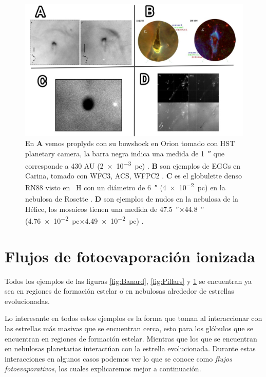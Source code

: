 \documentclass{book}
\begin{document}
\begin{figure}[htb]
    \centering
    \includegraphics[width=1 \textwidth]{images Chapter 1/C1_Globulettes.jpg}
    \caption{En \textbf{A} vemos proplyds con su bowshock en Orion tomado con HST planetary camera, la barra negra indica una medida de \SI{1}{\arcsecond} que corresponde a 430 AU (\SI{2e-3}{pc}) \citep{Garcia-Arredondo:2001}. \textbf{B} son ejemplos de EGGs en Carina, tomado con WFC3, ACS, WFPC2 \citep{Mesa-Delgado:2016}. \textbf{C} es el globulette denso RN88 visto en \SI{}{H_\alpha} con un diámetro de \SI{6}{\arcsecond} (\SI{4e-2}{pc}) en la nebulosa de Rosette \citep{GFGahm:2013}. \textbf{D} son ejemplos de nudos en la nebulosa de la Hélice, los mosaicos tienen una medida de \SI{47.5}{\arcsecond}$\times$\SI{44.8}{\arcsecond} (\SI{4.76e-2}{pc}$\times$\SI{4.49e-2}{pc}) \citep{O'Dell:2007}. }
    \label{fig:nudos}
\end{figure}



\section{Flujos de fotoevaporación ionizada} \label{Sec:fluijos fotoevaporativos}

Todos los ejemplos de las figuras \ref{fig:Banard}, \ref{fig:Pillars} y \ref{fig:nudos} se encuentran ya sea en regiones de formación estelar o en nebulosas alrededor de estrellas evolucionadas. 

Lo interesante en todos estos ejemplos es la forma que toman al interaccionar con las estrellas más masivas que se encuentran cerca, esto para los glóbulos que se encuentran en regiones de formación estelar.  Mientras que los que se encuentran en nebulosas planetarias interactúan con la estrella evolucionada. Durante estas interacciones en algunos casos podemos ver lo que se conoce como \textit{flujos fotoevaporativos}, los cuales explicaremos mejor a continuación.
\end{document}
